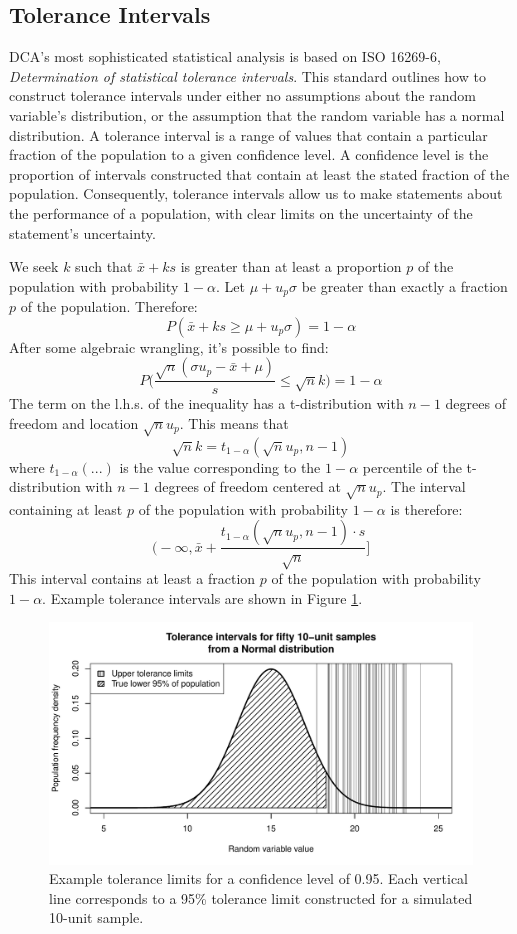 \documentclass[11pt,a4paper,article]{memoir} %
\begin{document}
\subsection*{Tolerance Intervals}
DCA's most sophisticated statistical analysis is based on ISO 16269-6, \emph{Determination of statistical tolerance intervals}. This standard outlines how to construct tolerance intervals under either no assumptions about the random variable's distribution, or the assumption that the random variable has a normal distribution. A tolerance interval is a range of values that contain a particular fraction of the population to a given confidence level. A confidence level is the proportion of intervals constructed that contain at least the stated fraction of the population. Consequently, tolerance intervals allow us to make statements about the performance of a population, with clear limits on the uncertainty of the statement's uncertainty.
\par
We seek $k$ such that $\bar{x} + ks$ is greater than at least a proportion $p$ of the population with probability $1 - \alpha$. Let $\mu + u_p \sigma$ be greater than exactly a fraction $p$ of the population. Therefore:
\[
	P(\bar{x} + ks \geq \mu + u_p \sigma) = 1 - \alpha
\]
After some algebraic wrangling, it's possible to find:
\[
	P\Big(\frac{\sqrt{n}(\sigma u_p - \bar{x} + \mu)}{s} \leq \sqrt{n}k\Big) = 1 - \alpha
\]
The term on the l.h.s. of the inequality has a t-distribution with $n - 1$ degrees of freedom and location $\sqrt{n}u_p$. This means that 
\[
	\sqrt{n}k = t_{1 - \alpha}(\sqrt{n}u_p, n - 1)
\]
where $t_{1 - \alpha}(...)$ is the value corresponding to the $1 - \alpha$ percentile of the t-distribution with $n - 1$ degrees of freedom centered at $\sqrt{n}u_p$. The interval containing at least $p$ of the population with probability $1 - \alpha$ is therefore:
\[
	\Big(-\infty, \bar{x} + \frac{t_{1 - \alpha}(\sqrt{n}u_p, n - 1)\cdot s}{\sqrt{n}}\Big]
\]
This interval contains at least a fraction $p$ of the population with probability $1 - \alpha$. Example tolerance intervals are shown in Figure \ref{fig:tolerance_intervals}.
\begin{figure}
\includegraphics[width=\textwidth]{tolerance_intervals.pdf}
\caption{Example tolerance limits for a confidence level of 0.95. Each vertical line corresponds to a 95\% tolerance limit constructed for a simulated 10-unit sample.}
\label{fig:tolerance_intervals}
\end{figure}
\end{document}
